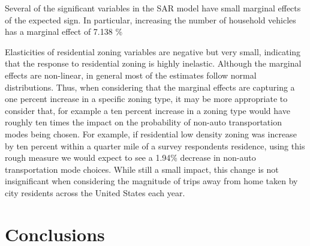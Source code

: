 \begin{singlespace}
	
\end{singlespace}
Several of the significant variables in the SAR model have small marginal effects of the expected sign.  In particular, increasing the number of household vehicles has a marginal effect of 7.138 \%
\begin{singlespace}
	
\end{singlespace}
\begin{singlespace}
	
\end{singlespace}
\begin{singlespace}
	
\end{singlespace}


Elasticities of residential zoning variables are negative but very small, indicating that the response to residential zoning is highly inelastic. Although the marginal effects are non-linear, in general most of the estimates follow normal distributions.  Thus, when considering that the marginal effects are capturing a one percent increase in a specific zoning type, it may be more appropriate to consider that, for example a ten percent increase in a zoning type would have roughly ten times the impact on the probability of non-auto transportation modes being chosen.   For example, if residential low density zoning was increase by ten percent within a quarter mile of a survey respondents residence, using this rough measure we would expect to see a 1.94\% decrease in non-auto transportation mode choices.  While still a small impact, this change is not insignificant when considering the magnitude of trips away from home taken by city residents across the United States each year.



\section{Conclusions}

